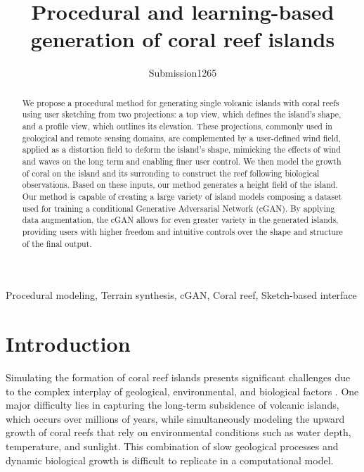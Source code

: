 \documentclass{egpubl}
\title[Procedural and learning-based generation of coral reef islands]{Procedural and learning-based generation of coral reef islands}
\author[Submission1265]{Submission1265}
\begin{document}

\maketitle

\begin{abstract}
We propose a procedural method for generating single volcanic islands with coral reefs using user sketching from two projections: a top view, which defines the island's shape, and a profile view, which outlines its elevation. These projections, commonly used in geological and remote sensing domains, are complemented by a user-defined wind field, applied as a distortion field to deform the island's shape, mimicking the effects of wind and waves on the long term and enabling finer user control. We then model the growth of coral on the island and its surronding to construct the reef following biological observations. Based on these inputs, our method generates a height field of the island. Our method is capable of creating a large variety of island models composing a dataset used for training a conditional Generative Adversarial Network (cGAN). By applying data augmentation, the cGAN allows for even greater variety in the generated islands, providing users with higher freedom and intuitive controls over the shape and structure of the final output.
\end{abstract}

\begin{keywords}
Procedural modeling, Terrain synthesis, cGAN, Coral reef, Sketch-based interface
\end{keywords}

\section{Introduction}

Simulating the formation of coral reef islands presents significant challenges due to the complex interplay of geological, environmental, and biological factors \cite{Hopley2014}. One major difficulty lies in capturing the long-term subsidence of volcanic islands, which occurs over millions of years, while simultaneously modeling the upward growth of coral reefs that rely on environmental conditions such as water depth, temperature, and sunlight. This combination of slow geological processes and dynamic biological growth is difficult to replicate in a computational model.
\end{document}
